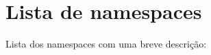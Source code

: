 \section{Lista de namespaces}
Lista dos namespaces com uma breve descrição\+:\begin{DoxyCompactList}
\item{}
\end{DoxyCompactList}
